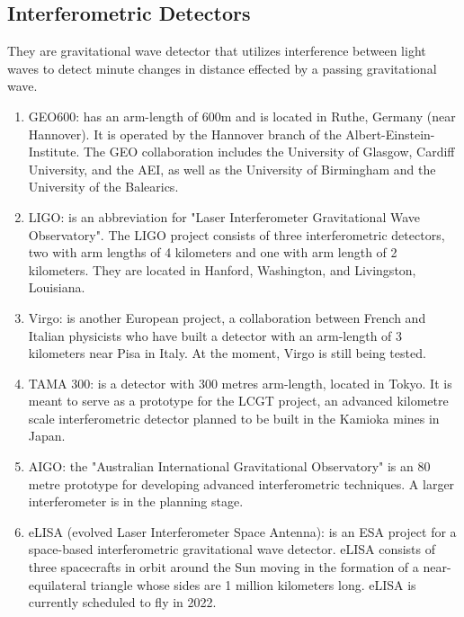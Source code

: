\documentclass[11]{article}
\begin{document}
\subsection{Interferometric Detectors}
They are gravitational wave detector that utilizes interference between light waves to detect minute changes in distance effected by a passing gravitational wave.
\begin{enumerate}
\item GEO600: has an arm-length of 600m and is located in Ruthe, Germany (near Hannover). It is operated by the Hannover branch of the Albert-Einstein-Institute. The GEO collaboration includes the University of Glasgow, Cardiff University, and the AEI, as well as the University of Birmingham and the University of the Balearics.

\item LIGO: is an abbreviation for "Laser Interferometer Gravitational Wave Observatory". The LIGO project consists of three interferometric detectors, two with arm lengths of 4 kilometers and one with arm length of 2 kilometers. They are located in Hanford, Washington, and Livingston, Louisiana.

\item Virgo: is another European project, a collaboration between French and Italian physicists who have built a detector with an arm-length of 3 kilometers near Pisa in Italy. At the moment, Virgo is still being tested.

\item TAMA 300: is a detector with 300 metres arm-length, located in Tokyo. It is meant to serve as a prototype for the LCGT project, an advanced kilometre scale interferometric detector planned to be built in the Kamioka mines in Japan.

\item AIGO: the "Australian International Gravitational Observatory" is an 80 metre prototype for developing advanced interferometric techniques. A larger interferometer is in the planning stage.

\item eLISA (evolved Laser Interferometer Space Antenna): is an ESA project for a space-based interferometric gravitational wave detector. eLISA consists of three spacecrafts in orbit around the Sun moving in the formation of a near-equilateral triangle whose sides are 1 million kilometers long. eLISA is currently scheduled to fly in 2022.
\end{enumerate}
\end{document}
